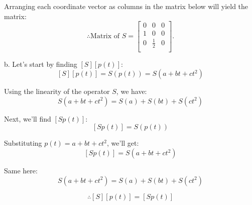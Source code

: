 \documentclass{book}
\begin{document}
Arranging each coordinate vector as columns in the matrix below will yield the matrix:
\[
	\therefore \text{Matrix of } S =
	\begin{bmatrix}
		0 & 0 & 0 \\
		1 & 0 & 0 \\
		0 & \frac{1}{2} & 0 \\
	\end{bmatrix}.
\]

\bigskip

b. Let's start by finding \([S][p(t)]\):
\[
	[S][p(t)] = S(p(t)) = S(a + bt + ct^2)
\]

Using the linearity of the operator \( S \), we have:
\[
	S(a + bt + ct^2) = S(a) + S(bt) + S(ct^2)
\]

Next, we'll find \([Sp(t)]\):
\[
	[Sp(t)] = S(p(t))
\]

Substituting \( p(t) = a + bt + ct^2 \), we'll get:
\[
	[Sp(t)] = S(a + bt + ct^2)
\]

Same here:
\[
	S(a + bt + ct^2) = S(a) + S(bt) + S(ct^2)
\]

\[
	\therefore [S][p(t)] = [Sp(t)]
\]
\end{document}
